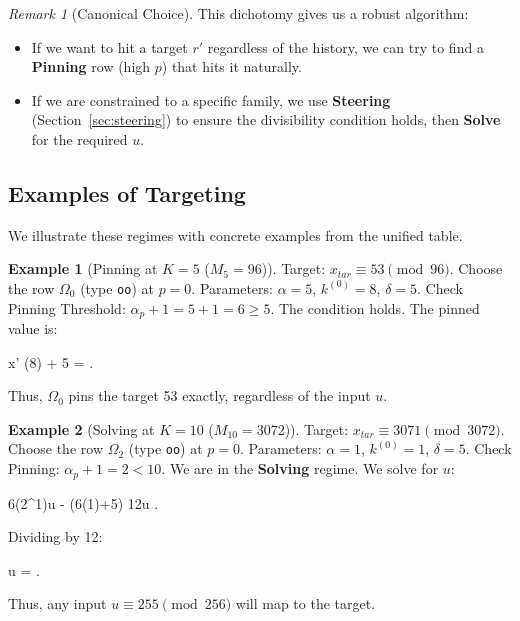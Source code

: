 \documentclass[11pt,letterpaper]{amsart}
\def\mathrm#1{#1}%
\def\[{ }%
\def\]{ }%
\theoremstyle{definition}
\newtheorem{example}{Example}
\theoremstyle{plain}
\theoremstyle{plain}
\theoremstyle{remark}
\newtheorem*{remark}{Remark}
\begin{document}
\begin{remark}[Canonical Choice]
This dichotomy gives us a robust algorithm:
\begin{itemize}
    \item If we want to hit a target $r'$ regardless of the history, we can try to find a \textbf{Pinning} row (high $p$) that hits it naturally.
    \item If we are constrained to a specific family, we use \textbf{Steering} (Section~\ref{sec:steering}) to ensure the divisibility condition holds, then \textbf{Solve} for the required $u$.
\end{itemize}
\end{remark}

\subsection{Examples of Targeting}

We illustrate these regimes with concrete examples from the unified table.

\begin{example}[Pinning at $K=5$ ($M_5=96$)]
Target: $x_{\mathrm{tar}} \equiv 53 \pmod{96}$.
Choose the row $\Omega_0$ (type \texttt{oo}) at $p=0$.
Parameters: $\alpha=5$, $k^{(0)}=8$, $\delta=5$.
Check Pinning Threshold: $\alpha_p + 1 = 5 + 1 = 6 \ge 5$. The condition holds.
The pinned value is:
\[
x' \;\equiv{}(8) + 5 \;= .
\]
Thus, $\Omega_0$ pins the target 53 exactly, regardless of the input $u$.
\end{example}

\begin{example}[Solving at $K=10$ ($M_{10}=3072$)]
Target: $x_{\mathrm{tar}} \equiv 3071 \pmod{3072}$.
Choose the row $\Omega_2$ (type \texttt{oo}) at $p=0$.
Parameters: $\alpha=1$, $k^{(0)}=1$, $\delta=5$.
Check Pinning: $\alpha_p + 1 = 2 < 10$. We are in the \textbf{Solving} regime.
We solve for $u$:
\[
6(2^1)u \;\equiv{} - (6(1)+5)  \implies 12u  .
\]
Dividing by 12:
\[
u \;\equiv\;  \;= .
\]
Thus, any input $u \equiv 255 \pmod{256}$ will map to the target.
\end{example}
\end{document}
